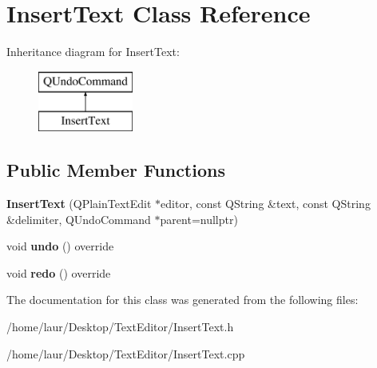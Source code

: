 \hypertarget{class_insert_text}{}\section{Insert\+Text Class Reference}
\label{class_insert_text}
Inheritance diagram for Insert\+Text\+:\begin{figure}[H]
\begin{center}
\leavevmode
\includegraphics[height=2.000000cm]{class_insert_text}
\end{center}
\end{figure}
\subsection*{Public Member Functions}
\begin{DoxyCompactItemize}
\item 
\mbox{\label{class_insert_text_a81753e5c53a97be47b09b2d88ba16cae}} 
{\bfseries Insert\+Text} (Q\+Plain\+Text\+Edit $\ast$editor, const Q\+String \&text, const Q\+String \&delimiter, Q\+Undo\+Command $\ast$parent=nullptr)
\item 
\mbox{\label{class_insert_text_a225926a1d60d347575ac77ad47a9f4fe}} 
void {\bfseries undo} () override
\item 
\mbox{\label{class_insert_text_adb183bda76ba999719e467097fb17212}} 
void {\bfseries redo} () override
\end{DoxyCompactItemize}


The documentation for this class was generated from the following files\+:\begin{DoxyCompactItemize}
\item 
/home/laur/\+Desktop/\+Text\+Editor/Insert\+Text.\+h\item 
/home/laur/\+Desktop/\+Text\+Editor/Insert\+Text.\+cpp\end{DoxyCompactItemize}
